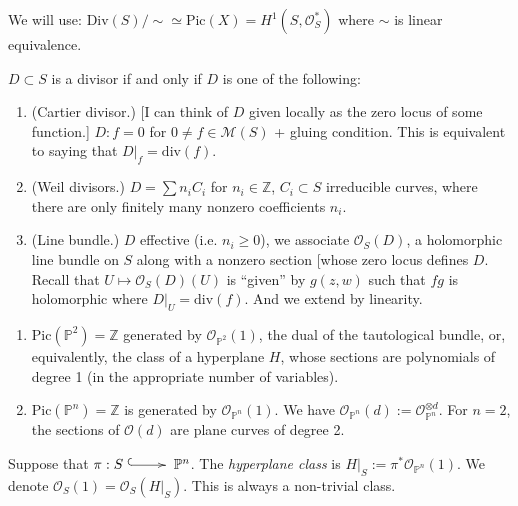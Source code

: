 \noindent
We will use: $\text{Div}(S)/\sim \simeq
\text{Pic}(X)=H^1(S,\mathcal{O}_S^*)$
where $\sim$ is linear equivalence.

$D \subset S$ is a divisor if and only if $D$
is one of the following:
\begin{enumerate}
\item (Cartier divisor.)
[I can think of $D$ given locally as the zero
locus of some function.]
$D:f=0$ for  $0 \neq  f \in \mathcal{M}(S)$ +
gluing condition.
This is equivalent to saying that
$D|_f=\text{div}(f)$.

\item (Weil divisors.)
$D=\sum n_iC_i$ for $n_i \in \mathbb{Z}$,
$C_i \subset S$ irreducible curves,
where there are only finitely many nonzero
coefficients $n_i$.

\item (Line bundle.)
$D$ effective (i.e. $n_i\geq 0$), we
associate
$\mathcal{O}_S(D)$, a holomorphic line bundle
on $S$ along
with a nonzero section [whose zero locus
defines $D$.
Recall that $U \mapsto  \mathcal{O}_S(D)(U)$
is ``given''
by $g(z,w)$ such that  $fg$ is holomorphic
where $D|_U=\text{div}(f)$.
And we extend by linearity.
\end{enumerate}


\begin{example}
\label{example-divisors}
\begin{enumerate}
\item $\text{Pic}(\mathbb{P}^2)=\mathbb{Z}$
generated by $\mathcal{O}_{\mathbb{P}^2}(1)$,
the dual of the tautological bundle, or,
equivalently,
the class of a hyperplane $H$,
whose sections are polynomials of degree 1
(in the appropriate number of variables).

\item $\text{Pic}(\mathbb{P}^n)=\mathbb{Z}$
is generated by
$\mathcal{O}_{\mathbb{P}^n}(1)$.
We have
$\mathcal{O}_{\mathbb{P}^n}(d):=\mathcal{O}
_{\mathbb{P}^n}^{\otimes
d}$.
For $n=2$, the sections of $\mathcal{O}(d)$
are
plane curves of degree 2.
\end{enumerate}
\end{example}

\noindent
Suppose that $\pi:S
\xymatrix{\ar@{^{(}->}[r]&} \mathbb{P}^n$.
The {\it hyperplane class} is  $H|_S:=
\pi^*\mathcal{O}_{\mathbb{P}^n}(1)$.
We denote
$\mathcal{O}_S(1)=\mathcal{O}_S(H|_S)$.
This is always a non-trivial class.

